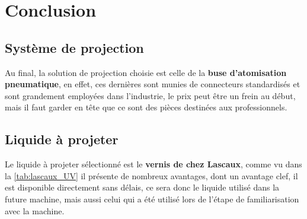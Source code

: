 \section{Conclusion}\label{sec:conclusion_etat_art}
\subsection{Système de projection}
Au final, la solution de projection choisie est celle de la \textbf{buse d'atomisation pneumatique}, en effet, ces dernières sont
munies de connecteurs standardisés et sont grandement employées dans l'industrie, le prix peut être un frein au début, mais il faut
garder en tête que ce sont des pièces destinées aux professionnels.

\subsection{Liquide à projeter}
Le liquide à projeter sélectionné est le \textbf{vernis de chez Lascaux}, comme vu dans la \autoref{tab:lascaux_UV} il présente de nombreux avantages, dont
un avantage clef, il est disponible directement sans délais, ce sera donc le liquide utilisé dans la future machine, mais aussi celui qui a été utilisé lors de
l'étape de familiarisation avec la machine.